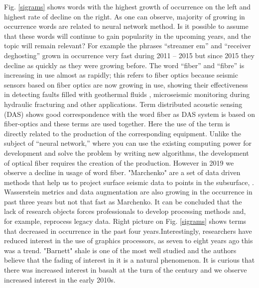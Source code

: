 \documentclass[geosciences,article,submit,moreauthors,pdftex]{Definitions/mdpi}
\begin{document}
Fig. \ref{sigrams} shows words with the highest growth of occurrence on the left and highest rate of decline on the right. As one can observe, majority of growing in occurrence words are related to neural network method. Is it possible to assume that these words will continue to gain popularity in the upcoming years, and the topic will remain relevant? For example the phrases “streamer em” and “receiver deghosting” grown in occurrence very fast during 2011 – 2015 but since 2015 they decline as quickly as they were growing before. The word “fiber” and “fibre” is increasing in use almost as rapidly; this refers to fiber optics because seismic sensors based on fiber optics are now growing in use, showing their effectiveness in detecting faults filled with geothermal fluids \citep{Trainor-Guitton2018}, microseismic monitoring during hydraulic fracturing \citep{Binder2019} and other applications. Term  distributed acoustic sensing (DAS) shows good correspondence with the word fiber as DAS system is based on fiber-optics and these terms are used together. Here the use of the term is directly related to the production of the corresponding equipment. Unlike the subject of “neural network,” where you can use the existing computing power for development and solve the problem by writing new algorithms, the development of optical fiber requires the creation of the production. However in 2019 we observe a decline in usage of word fiber. "Marchenko" are a set of data driven methods that help us to project surface seismic data to points in the subsurface, \citep{Lomas2019}. Wasserstein metrics and data augmentation are also growing in the occurrence in past three years but not that fast as Marchenko. It can be concluded that the lack of research objects forces professionals to develop processing methods and, for example, reprocess legacy data. Right picture on Fig. \ref{sigrams} shows terms that decreased in occurrence in the past four years.Interestingly, researchers have reduced interest in the use of graphics processors, as seven to eight years ago this was a trend. "Barnett" shale is one of the most well studied and the authors believe that the fading of interest in it is a natural phenomenon. It is curious that there was increased interest in basalt at the turn of the century and we observe increased interest in the early 2010s.
\end{document}
